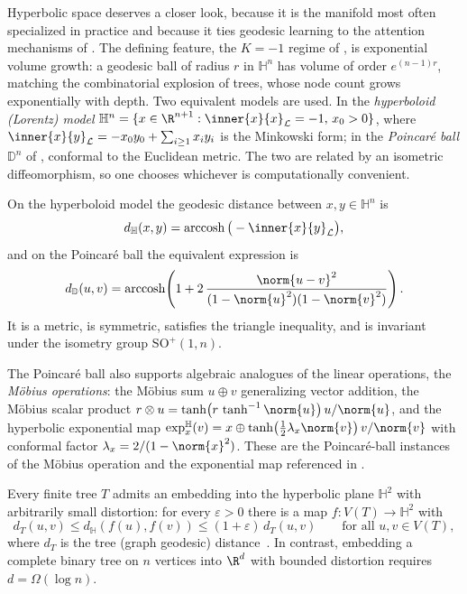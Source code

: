 Hyperbolic space deserves a closer look, because it is the manifold most often
specialized in practice and because it ties geodesic learning to the attention
mechanisms of . The defining feature, the $K = -1$ regime of
, is exponential volume growth: a geodesic ball of
radius $r$ in $\mathbb{H}^n$ has volume of order $e^{(n-1)r}$, matching the
combinatorial explosion of trees, whose node count grows exponentially with
depth. Two equivalent models are used. In the \emph{hyperboloid (Lorentz)
model} $\mathbb{H}^n = \{x \in \R^{n+1} : \inner{x}{x}_{\mathcal L} = -1,\,
x_0 > 0\}$, where $\inner{x}{y}_{\mathcal L} = -x_0 y_0 + \sum_{i\ge 1} x_i y_i$
is the Minkowski form; in the \emph{Poincar\'e ball} $\mathbb{D}^n$ of
, conformal to the Euclidean metric. The two are related by
an isometric diffeomorphism, so one chooses whichever is computationally
convenient.

\begin{definition}
\label{def:geo:hyperbolic-distance}
On the hyperboloid model the geodesic distance between $x, y \in \mathbb{H}^n$
is
\[
  d_{\mathbb{H}}(x,y) = \operatorname{arccosh}\big(-\inner{x}{y}_{\mathcal L}\big),
\]
and on the Poincar\'e ball the equivalent expression is
\[
  d_{\mathbb{D}}(u,v) = \operatorname{arccosh}\!\left(
    1 + 2\,\frac{\norm{u-v}^2}{(1 - \norm{u}^2)(1 - \norm{v}^2)}\right).
\]
It is a metric, is symmetric, satisfies the triangle inequality, and is
invariant under the isometry group $\mathrm{SO}^+(1,n)$.
\end{definition}

The Poincar\'e ball also supports algebraic analogues of the linear operations,
the \emph{M\"obius operations}: the M\"obius sum
$u \oplus v$ generalizing vector addition, the M\"obius scalar product
$r \otimes u = \tanh\!\big(r\,\tanh^{-1}\norm{u}\big)\,u/\norm{u}$, and the
hyperbolic exponential map
$\exp^{\mathbb{H}}_x(v) = x \oplus \tanh\!\big(\tfrac{1}{2}\lambda_x\norm{v}\big)
\,v/\norm{v}$ with conformal factor $\lambda_x = 2/(1-\norm{x}^2)$. These are
the Poincar\'e-ball instances of the M\"obius operation and the exponential map
referenced in .

\begin{theorem}
\label{thm:geo:tree-embedding}
Every finite tree $T$ admits an embedding into the hyperbolic plane
$\mathbb{H}^2$ with arbitrarily small distortion: for every $\varepsilon > 0$
there is a map $f \colon V(T) \to \mathbb{H}^2$ with
\[
  d_T(u,v) \le d_{\mathbb{H}}(f(u), f(v)) \le (1+\varepsilon)\, d_T(u,v)
  \qquad \text{for all } u, v \in V(T),
\]
where $d_T$ is the tree (graph geodesic) distance~\citep{sarkar2011low}. In
contrast, embedding a complete binary tree on $n$ vertices into $\R^d$ with
bounded distortion requires $d = \Omega(\log n)$.
\end{theorem}


